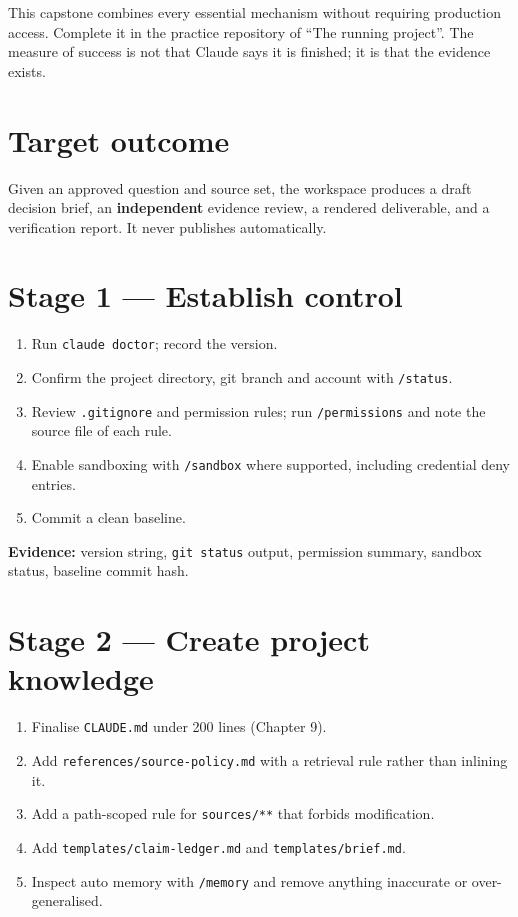 \documentclass[11pt,a4paper,twoside,openany]{book}
\begin{document}
This capstone combines every essential mechanism without requiring production access. Complete it in the practice repository of “The running project”. The measure of success is not that Claude says it is finished; it is that the evidence exists.


\FloatBarrier
\setcounter{section}{0}
\section{Target outcome}

Given an approved question and source set, the workspace produces a draft decision brief, an \textbf{independent} evidence review, a rendered deliverable, and a verification report. It never publishes automatically.


\FloatBarrier
\setcounter{section}{1}
\section{Stage 1 — Establish control}

\begin{enumerate}
\item Run \texttt{claude doct\allowbreak{}or}; record the version.
\item Confirm the project directory, git branch and account with \texttt{/\allowbreak{}status}.
\item Review \texttt{.\allowbreak{}gitignore} and permission rules; run \texttt{/\allowbreak{}permissions} and note the source file of each rule.
\item Enable sandboxing with \texttt{/\allowbreak{}sandbox} where supported, including credential deny entries.
\item Commit a clean baseline.
\end{enumerate}

\textbf{Evidence:} version string, \texttt{git status} output, permission summary, sandbox status, baseline commit hash.


\FloatBarrier
\setcounter{section}{2}
\section{Stage 2 — Create project knowledge}

\begin{enumerate}
\item Finalise \texttt{CLAUDE.\allowbreak{}md} under 200 lines (Chapter 9).
\item Add \texttt{references/\allowbreak{}source-\allowbreak{}policy.\allowbreak{}md} with a retrieval rule rather than inlining it.
\item Add a path-scoped rule for \texttt{sources/\allowbreak{}**} that forbids modification.
\item Add \texttt{templates/\allowbreak{}claim-\allowbreak{}ledger.\allowbreak{}md} and \texttt{templates/\allowbreak{}brief.\allowbreak{}md}.
\item Inspect auto memory with \texttt{/\allowbreak{}memory} and remove anything inaccurate or over-generalised.
\end{enumerate}
\end{document}
